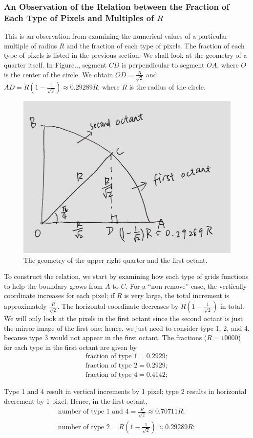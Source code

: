 \documentclass[letterpaper]{article}
\numberwithin{equation}{section} %
\numberwithin{figure}{section} %
\numberwithin{table}{section} %
\begin{document}
\subsubsection{An Observation of the Relation between the Fraction of Each Type of Pixels and Multiples of $R$}

This is an observation from examining the numerical values of a particular multiple of radius $R$ and the fraction of each type of pixels. The fraction of each type of pixels is listed in the previous section. We shall look at the geometry of a quarter itself. In Figure.., segment $CD$ is perpendicular to segment $OA$, where $O$ is the center of the circle. We obtain $OD=\frac{R}{\sqrt{2}}$ and $AD=R(1-\frac{1}{\sqrt{2}}) \approx 0.29289R$, where $R$ is the radius of the circle.

\begin{figure}[h]
	\centering
	\includegraphics[width=0.4\linewidth]{4tyMultR}
	\caption{The geometry of the upper right quarter and the first octant.}
	\label{fig:4tyMultR}
\end{figure}

\noindent
To construct the relation, we start by examining how each type of grids functions to help the boundary grows from $A$ to $C$. For a \enquote{non-remove} case, the vertically coordinate increases for each pixel; if $R$ is very large, the total increment is approximately $\frac{R}{\sqrt{2}}$. The horizontal coordinate decreases by $R(1-\frac{1}{\sqrt{2}})$ in total. We will only look at the pixels in the first octant since the second octant is just the mirror image of the first one; hence, we just need to consider type 1, 2, and 4, because type 3 would not appear in the first octant. The fractions ($R=10000$) for each type in the first octant are given by 
\begin{align} 
\text{fraction of type 1} = 0.2929;\\
\text{fraction of type 2} = 0.2929;\\
\text{fraction of type 4} = 0.4142;
\end{align}

\noindent
Type 1 and 4 result in vertical increments by 1 pixel; type 2 results in horizontal decrement by 1 pixel. Hence, in the first octant, 
\begin{align} 
\text{number of type 1 and 4}=\frac{R}{\sqrt{2}} \approx 0.70711R;\\
\text{number of type 2}=R(1-\frac{1}{\sqrt{2}}) \approx 0.29289R;
\end{align}
\end{document}
